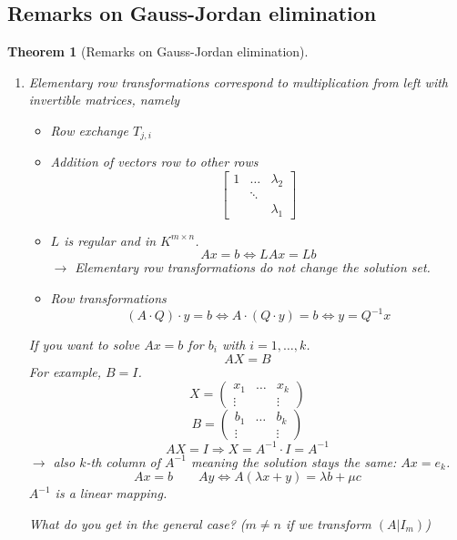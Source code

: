 \documentclass[a4paper,landscape,twocolumn]{article}
\newtheorem{theorem}{Theorem}
\begin{document}
\subsection{Remarks on Gauss-Jordan elimination}
\begin{theorem}[Remarks on Gauss-Jordan elimination]
  \label{satz-6.45}
  \begin{enumerate}
    \item Elementary row transformations correspond to multiplication from left with invertible matrices, namely
      \begin{itemize}
        \item Row exchange $T_{j,i}$
        \item Addition of vectors row to other rows
          \[
            \begin{bmatrix}
              1 & \ldots & \lambda_2 \\
                & \ddots & \\
                &        & \lambda_1
            \end{bmatrix}
          \]
        \item $L$ is regular and in $K^{m\times n}$.
          \[ Ax = b \Leftrightarrow LAx = Lb \]
          $\rightarrow$ Elementary row transformations do not change the solution set.
        \item Row transformations
          \[ (A \cdot Q) \cdot y = b \Leftrightarrow A \cdot (Q \cdot y) = b \Leftrightarrow y = Q^{-1} x \]
      \end{itemize}
      If you want to solve $Ax = b$ for $b_i$ with $i = 1, \ldots, k$.
      \[ AX = B \]
      For example, $B = I$.
      \[
        X =
        \begin{pmatrix}
          x_1 & \ldots & x_k \\
          \vdots &  & \vdots
        \end{pmatrix}
      \] \[
        B =
        \begin{pmatrix}
          b_1 & \ldots & b_k \\
          \vdots &  & \vdots
        \end{pmatrix}
      \]
      \[ AX = I \Rightarrow X = A^{-1} \cdot I = A^{-1} \]
      $\rightarrow$ also $k$-th column of $A^{-1}$ meaning the solution stays the same: $Ax = e_k$.
      \[ Ax = b \qquad Ay \Leftrightarrow A(\lambda x + y) = \lambda b + \mu c \]
      $A^{-1}$ is a linear mapping.

      What do you get in the general case? ($m \neq n$ if we transform $(A | I_m)$)
  \end{enumerate}
\end{theorem}
\end{document}
